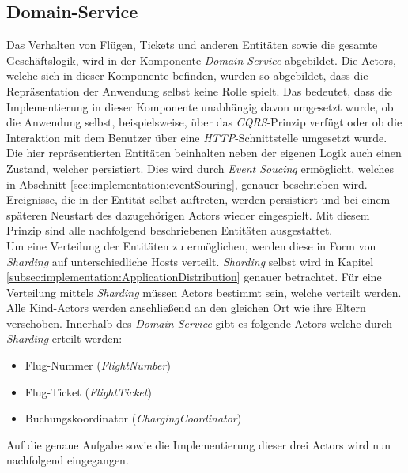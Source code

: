 \subsection{Domain-Service}
\label{subsec:implementation:domainService} 
Das Verhalten von Flügen, Tickets und anderen Entitäten sowie die gesamte Geschäftslogik, wird in der Komponente \textit{Domain-Service} abgebildet. Die Actors, welche sich in dieser Komponente befinden, wurden so abgebildet, dass die Repräsentation der Anwendung selbst keine Rolle spielt. Das bedeutet, dass die Implementierung in dieser Komponente unabhängig davon umgesetzt wurde, ob die Anwendung selbst, beispielsweise, über das \textit{CQRS}-Prinzip verfügt oder ob die Interaktion mit dem Benutzer über eine \textit{HTTP}-Schnittstelle umgesetzt wurde. \\
Die hier repräsentierten Entitäten beinhalten neben der eigenen Logik auch einen Zustand, welcher persistiert. Dies wird durch \textit{Event Soucing} ermöglicht, welches in Abschnitt \ref{sec:implementation:eventSouring}, genauer beschrieben wird. Ereignisse, die in der Entität selbst auftreten, werden persistiert und bei einem späteren Neustart des dazugehörigen Actors wieder eingespielt. Mit diesem Prinzip sind alle nachfolgend beschriebenen Entitäten ausgestattet. \\
Um eine Verteilung der Entitäten zu ermöglichen, werden diese in Form von \textit{Sharding} auf unterschiedliche Hosts verteilt. \textit{Sharding} selbst wird in Kapitel \ref{subsec:implementation:ApplicationDistribution} genauer betrachtet. Für eine Verteilung mittels \textit{Sharding} müssen Actors bestimmt sein, welche verteilt werden. Alle Kind-Actors werden anschließend an den gleichen Ort wie ihre Eltern verschoben. Innerhalb des \textit{Domain Service} gibt es folgende Actors welche durch \textit{Sharding} erteilt werden:
\begin{itemize}
  \item Flug-Nummer (\textit{FlightNumber})
  \item Flug-Ticket (\textit{FlightTicket})
  \item Buchungskoordinator (\textit{ChargingCoordinator})
\end{itemize}
Auf die genaue Aufgabe sowie die Implementierung dieser drei Actors wird nun nachfolgend eingegangen.

